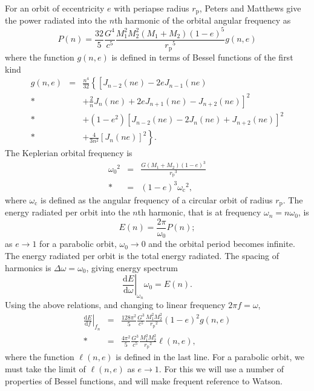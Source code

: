 \documentclass[aps,prd,reprint,showpacs,groupedaddress]{revtex4-1}
\newcommand{\sub}[1]{\ensuremath{_\text{#1}}}
\newcommand{\dd}{\ensuremath{\mathrm{d}}}
\newcommand{\diff}[2]{\ensuremath{\frac{\dd {#1}}{\dd {#2}}}}
\begin{document}
For an orbit of eccentricity $e$ with periapse radius $r\sub{p}$, Peters and Matthews\cite{Peters1963} give the power radiated into the $n$th harmonic of the orbital angular frequency as
\begin{equation}
P(n) = \frac{32}{5}\frac{G^4}{c^5}\frac{M_1^2M_2^2(M_1 + M_2)(1-e)^5}{r\sub{p}^5}g(n,e)
\label{eq:PM_P}
\end{equation}
where the function $g(n,e)$ is defined in terms of Bessel functions of the first kind
\begin{eqnarray}
g(n,e) & = & \frac{n^4}{32}\left\{\left[J_{n-2}(ne) - 2eJ_{n-1}(ne) \phantom{\frac{2}{n}J_n(ne)} \right. \right. \nonumber \\*
 & & \left. + \frac{2}{n}J_n(ne) + 2eJ_{n+1}(ne) - J_{n+2}(ne)\right]^2 \nonumber \\*
 & & + \left(1 - e^2\right)\left[J_{n-2}(ne) - 2J_n(ne) + J_{n+2}(ne)\right]^2 \nonumber \\*
 & & \left. + \frac{4}{3n^2}\left[J_n(ne)\right]^2\right\}.
\end{eqnarray}
The Keplerian orbital frequency is
\begin{eqnarray}
{\omega_0}^2 & = & \frac{G(M_1 + M_2)(1-e)^3}{r\sub{p}^3}\\*
 & = & (1-e)^3{\omega\sub{c}}^2,
\label{eq:Kepler_freq}
\end{eqnarray}
where $\omega\sub{c}$ is defined as the angular frequency of a circular orbit of radius $r\sub{p}$. The energy radiated per orbit into the $n$th harmonic, that is at frequency $\omega_n = n\omega_0$, is
\begin{equation}
E(n) = \frac{2\pi}{\omega_0}P(n);
\label{eq:E(n)}
\end{equation}
as $e \rightarrow 1$ for a parabolic orbit, $\omega_0 \rightarrow 0$ and the orbital period becomes infinite. The energy radiated per orbit is the total energy radiated. The spacing of harmonics is $\Delta\omega = \omega_0$, giving energy spectrum
\begin{equation}
\left.\diff{E}{\omega}\right|_{\omega_n}\omega_0 = E(n).
\end{equation}
Using the above relations, and changing to linear frequency $2\pi f = \omega$,
\begin{eqnarray}
\left.\diff{E}{f}\right|_{f_n} & = & \frac{128\pi^2}{5}\frac{G^3}{c^5}\frac{M_1^2M_2^2}{r\sub{p}^2}(1-e)^2g(n,e) \\*
 & = & \frac{4\pi^2}{5}\frac{G^3}{c^5}\frac{M_1^2M_2^2}{r\sub{p}^2}\ell(n,e),
\label{eq:PM_spectrum}
\end{eqnarray}
where the function $\ell(n,e)$ is defined in the last line. For a parabolic orbit, we must take the limit of $\ell(n,e)$ as $e \rightarrow 1$. For this we will use a number of properties of Bessel functions, and will make frequent reference to Watson\cite{Watson1995}.
\end{document}
